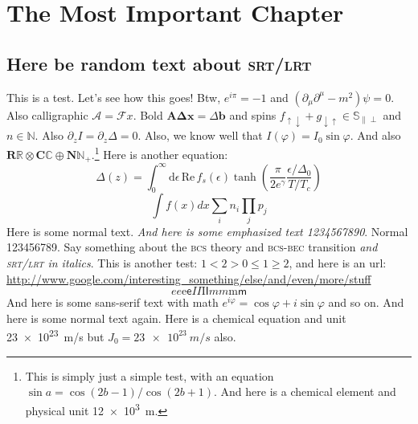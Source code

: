 \chapter{The Most Important Chapter}
\section{Here be random text about \textsc{srt/lrt}}
This is a test. Let's see how this goes! Btw, $e^{i\pi} = -1$ and $(\partial_\mu \partial^\mu - m^2) \psi = 0$.
Also calligraphic $\mathcal{A} = \mathcal{F}x$.
Bold $\symbf{A}\symbf{\Delta}\symbf{x} = \Delta\symbf{b}$ and spins $f_{\uparrow\downarrow}+g_{\downarrow\uparrow} \in \mathbb{S}_{\parallel\perp}$ and $n\in\mathbb{N}$.
Also $\partial_z I = \partial_z \Delta = 0$.
Also, we know well that $I(\varphi) = I_0 \sin \varphi$.  And also $\mathbf{R}\mathbb{R} \otimes \mathbf{C}\mathbb{C} \oplus \mathbf{N}\mathbb{N}_+$.\footnote{This is simply just a simple test, with an equation $\sin a = \cos(2b-1)/\cos(2b+1)$. And here is a chemical element  and physical unit \SI{12e3}{m}. }%
Here is another equation:
\begin{equation}
  \Delta(z) = \int_0^{\infty} \mathrm{d}\epsilon\,\mathrm{Re}\, f_s(\epsilon) \tanh\!\left(\frac{\pi}{2e^\gamma} \frac{\epsilon/\Delta_0}{T/T_c}\right)
\end{equation}
\begin{equation}
  \int f(x) dx \sum_i n_i \prod_j p_j
\end{equation}
Here is some normal text. \textit{And here is some emphasized text 1234567890}. Normal 123456789. 
Say something about the \textsc{bcs} theory and \textsc{bcs-bec} transition \emph{and \textsc{srt/lrt} in italics}.
This is another test: $1 < 2 > 0 \leq 1 \geq 2$, and here is an url: \url{http://www.google.com/interesting_something/else/and/even/more/stuff}
\begin{equation}
  \textit{e}e\mathrm{e}\textsf{e}%
  \textit{I}I\mathrm{I}\textsf{I}%
  \textit{m}m\mathrm{m}\textsf{m}%
\end{equation}
\textsf{And here is some sans-serif text with math $e^{i\varphi}=\cos\varphi+i\sin\varphi$ and so on.} And here is some normal text again.
Here is a chemical equation  and unit \SI{23e23}{m/s} but $J_0 = \SI{23e23}{m/s}$ also.


